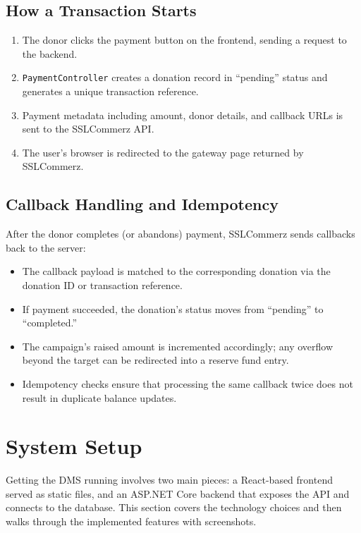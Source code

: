 \documentclass{thesis-library}
\begin{document}
\subsection{How a Transaction Starts}
\begin{enumerate}
    \item The donor clicks the payment button on the frontend, sending a request to the backend.
    \item \texttt{PaymentController} creates a donation record in ``pending'' status and generates a unique transaction reference.
    \item Payment metadata including amount, donor details, and callback URLs is sent to the SSLCommerz API.
    \item The user's browser is redirected to the gateway page returned by SSLCommerz.
\end{enumerate}

\subsection{Callback Handling and Idempotency}
After the donor completes (or abandons) payment, SSLCommerz sends callbacks back to the server:
\begin{itemize}
    \item The callback payload is matched to the corresponding donation via the donation ID or transaction reference.
    \item If payment succeeded, the donation's status moves from ``pending'' to ``completed.''
    \item The campaign's raised amount is incremented accordingly; any overflow beyond the target can be redirected into a reserve fund entry.
    \item Idempotency checks ensure that processing the same callback twice does not result in duplicate balance updates.
\end{itemize}


\section{System Setup}
Getting the DMS running involves two main pieces: a React-based frontend served as static files, and an ASP.NET Core backend that exposes the API and connects to the database. This section covers the technology choices and then walks through the implemented features with screenshots.
\end{document}
